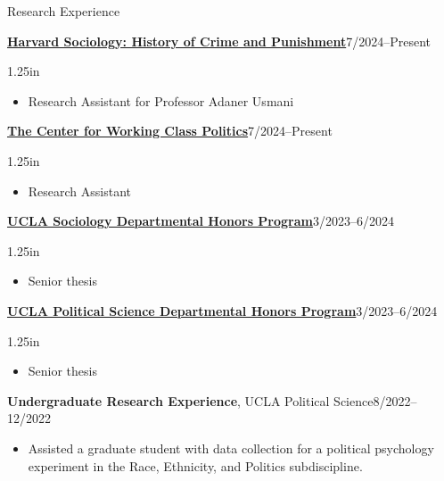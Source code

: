 \documentclass[12pt]{resume} %
\newcommand{\righthandindent}{1.25in}
\begin{document}
\begin{rSection}{Research Experience}

\href{https://sociology.fas.harvard.edu/}{\textbf{Harvard Sociology: History of Crime and Punishment}}\hfill 7/2024--Present
\begin{adjustwidth}{0pt}{\righthandindent}
\vspace{-7pt}
\begin{itemize}
    \item[] Research Assistant for Professor Adaner Usmani
\end{itemize}
\end{adjustwidth}

\href{https://www.workingclasspolitics.org/}{\textbf{The Center for Working Class Politics}}\hfill 7/2024--Present
\begin{adjustwidth}{0pt}{\righthandindent}
\vspace{-7pt}
\begin{itemize}
    \item[] Research Assistant
\end{itemize}
\end{adjustwidth}

\href{https://soc.ucla.edu/undergraduate-study/department-honors-program/}{\textbf{UCLA Sociology Departmental Honors Program}}\hfill{}3/2023--6/2024
\begin{adjustwidth}{0pt}{\righthandindent}
\vspace{-7pt}
\begin{itemize}
    \item[] Senior thesis
\end{itemize}
\end{adjustwidth}

\href{https://polisci.ucla.edu/academics/undergraduate/honors-program/}{\textbf{UCLA Political Science Departmental Honors Program}}\hfill{}3/2023--6/2024
\begin{adjustwidth}{0pt}{\righthandindent}
\vspace{-7pt}
\begin{itemize}
    \item[] Senior thesis
\end{itemize}
\end{adjustwidth}

\textbf{Undergraduate Research Experience}, UCLA Political Science\hfill{}8/2022--12/2022
\begin{adjustwidth}{0pt}{1.8in}
\vspace{-7pt}
\begin{itemize}
    \item[] Assisted a graduate student with data collection for a political psychology
experiment in the Race, Ethnicity, and Politics subdiscipline.
\end{itemize}
\end{adjustwidth}


\end{rSection}
\end{document}

